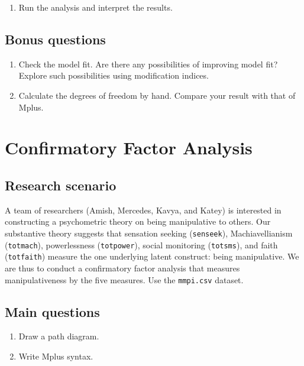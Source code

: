 \documentclass[
]{book}
\providecommand{\tightlist}{%
  \setlength{\itemsep}{0pt}\setlength{\parskip}{0pt}}
\begin{document}
\begin{enumerate}
\def\labelenumi{\arabic{enumi}.}
\setcounter{enumi}{2}
\tightlist
\item
  Run the analysis and interpret the results.
\end{enumerate}

\hypertarget{bonus-questions}{%
\section{Bonus questions}\label{bonus-questions}}

\begin{enumerate}
\def\labelenumi{\arabic{enumi}.}
\item
  Check the model fit. Are there any possibilities of improving model fit? Explore such possibilities using modification indices.
\item
  Calculate the degrees of freedom by hand. Compare your result with that of Mplus.
\end{enumerate}

\hypertarget{confirmatory-factor-analysis}{%
\chapter{Confirmatory Factor Analysis}\label{confirmatory-factor-analysis}}

\hypertarget{research-scenario-1}{%
\section{Research scenario}\label{research-scenario-1}}

A team of researchers (Amish, Mercedes, Kavya, and Katey) is interested in constructing a psychometric theory on being manipulative to others. Our substantive theory suggests that sensation seeking (\texttt{senseek}), Machiavellianism (\texttt{totmach}), powerlessness (\texttt{totpower}), social monitoring (\texttt{totsms}), and faith (\texttt{totfaith}) measure the one underlying latent construct: being manipulative. We are thus to conduct a confirmatory factor analysis that measures manipulativeness by the five measures. Use the \texttt{mmpi.csv} dataset.

\hypertarget{main-questions-1}{%
\section{Main questions}\label{main-questions-1}}

\begin{enumerate}
\def\labelenumi{\arabic{enumi}.}
\item
  Draw a path diagram.
\item
  Write Mplus syntax.
\end{enumerate}
\end{document}
